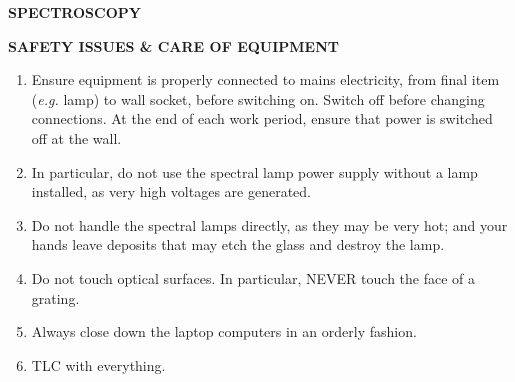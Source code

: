 \documentclass[12pt]{article}
\begin{document}
\newpage

\vspace*{6cm}

\begin{center}
{\Large\bf SPECTROSCOPY}
\end{center}
\newpage

\pagestyle{myheadings}
\setcounter{page}{1}



{\small
{}}
\vspace*{8mm}


{\begin{center}\bf SAFETY ISSUES \& CARE OF EQUIPMENT\end{center}}
\begin{enumerate}
\item Ensure equipment is properly connected to mains electricity, from final item ({\sl e.g.} lamp) to wall socket, before switching on. Switch off before changing connections. At the end of each work period, ensure that power is switched off at the wall.

\item In particular, do not use the spectral lamp power supply without a lamp installed, as very high voltages are generated.

\item Do not handle the spectral lamps directly, as they may be very hot; and your hands leave deposits that may etch the glass and destroy the lamp.

\item Do not touch optical surfaces. In particular, NEVER touch the face of a grating.

\item Always close down the laptop computers in an orderly fashion.

\item TLC with everything.
\end{enumerate}
\end{document}
